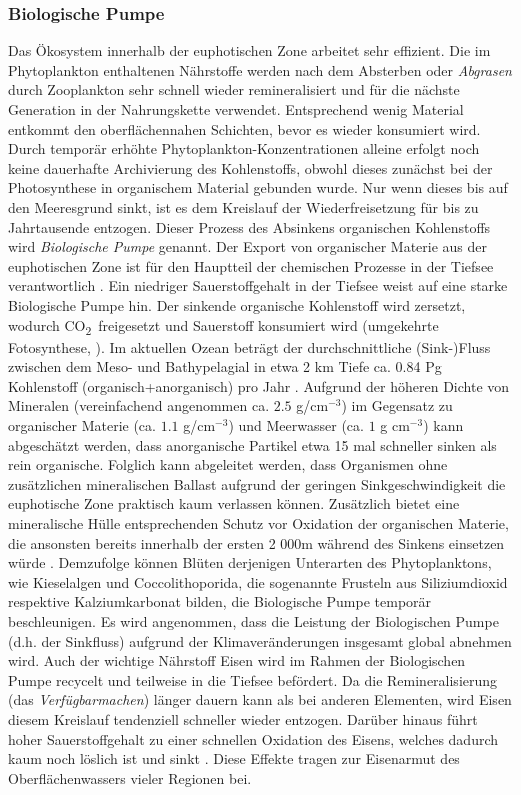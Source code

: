 \documentclass[12pt,a4paper,onecolumn,headheight=30pt]{scrartcl}
\newcommand{\cotwo}{CO\textsubscript{2}}
\begin{document}
\subsubsection{Biologische Pumpe} \label{sec:biopump}
Das Ökosystem innerhalb der euphotischen Zone arbeitet sehr effizient. Die im Phytoplankton enthaltenen Nährstoffe werden nach dem Absterben oder \textit{Abgrasen} durch Zooplankton sehr schnell wieder remineralisiert und für die nächste Generation in der Nahrungskette verwendet. Entsprechend wenig Material entkommt den oberflächennahen Schichten, bevor es wieder konsumiert wird. Durch temporär erhöhte Phytoplankton-Konzentrationen alleine erfolgt noch keine dauerhafte Archivierung des Kohlenstoffs, obwohl dieses zunächst bei der Photosynthese in organischem Material gebunden wurde. Nur wenn dieses bis auf den Meeresgrund sinkt, ist es dem Kreislauf der Wiederfreisetzung für bis zu Jahrtausende entzogen. Dieser Prozess des Absinkens organischen Kohlenstoffs wird \textit{Biologische Pumpe} genannt. Der Export von organischer Materie aus der euphotischen Zone ist für den Hauptteil der chemischen Prozesse in der Tiefsee verantwortlich \citep{Emerson.2009}. Ein niedriger Sauerstoffgehalt in der Tiefsee weist auf eine starke Biologische Pumpe hin. Der sinkende organische Kohlenstoff wird zersetzt, wodurch \cotwo \ freigesetzt und Sauerstoff konsumiert wird (umgekehrte Fotosynthese, \cite{Honjo.2008}). Im aktuellen Ozean beträgt der durchschnittliche (Sink-)Fluss zwischen dem Meso- und Bathypelagial in etwa 2 km Tiefe ca. 0.84 Pg Kohlenstoff (organisch+anorganisch) pro Jahr \citep{Honjo.2008}. Aufgrund der höheren Dichte von Mineralen (vereinfachend angenommen ca. $2.5$ g/cm$^{-3}$) im Gegensatz zu organischer Materie (ca. $1.1$ g/cm$^{-3}$) und Meerwasser (ca. $1$ g cm$^{-3}$) kann abgeschätzt werden, dass anorganische Partikel etwa 15 mal schneller sinken als rein organische. Folglich kann abgeleitet werden, dass Organismen ohne zusätzlichen mineralischen Ballast aufgrund der geringen Sinkgeschwindigkeit die euphotische Zone praktisch kaum verlassen können. Zusätzlich bietet eine mineralische Hülle entsprechenden Schutz vor Oxidation der organischen Materie, die ansonsten bereits innerhalb der ersten 2 000m während des Sinkens einsetzen würde \citep{Emerson.2009}. Demzufolge können Blüten derjenigen Unterarten des Phytoplanktons, wie Kieselalgen und Coccolithoporida, die sogenannte Frusteln aus Siliziumdioxid respektive Kalziumkarbonat bilden, die Biologische Pumpe temporär beschleunigen. Es wird angenommen, dass die Leistung der Biologischen Pumpe (d.h. der Sinkfluss) aufgrund der Klimaveränderungen insgesamt global abnehmen wird. Auch der wichtige Nährstoff Eisen wird im Rahmen der Biologischen Pumpe recycelt und teilweise in die Tiefsee befördert. Da die Remineralisierung (das \textit{Verfügbarmachen}) länger dauern kann als bei anderen Elementen, wird Eisen diesem Kreislauf tendenziell schneller wieder entzogen. Darüber hinaus führt hoher Sauerstoffgehalt zu einer schnellen Oxidation des Eisens, welches dadurch kaum noch löslich ist und sinkt \citep{Falkowski.1998}. Diese  Effekte tragen zur Eisenarmut des Oberflächenwassers vieler Regionen bei.
\end{document}
